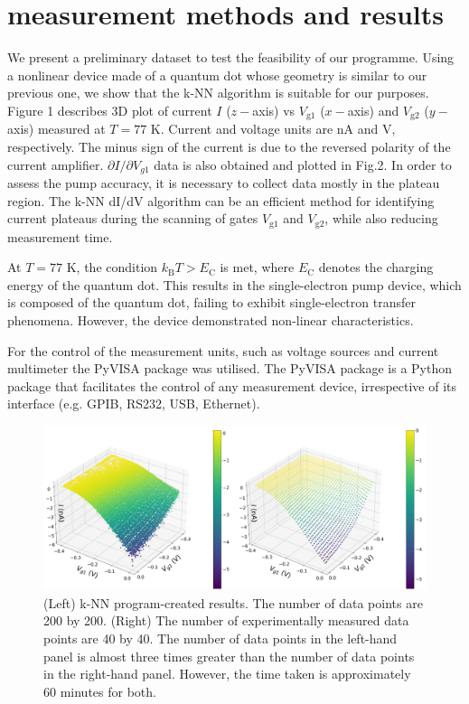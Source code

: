 \documentclass[jkps,preprint,fleqn,showpacs,showkeys]{revtex4}
\begin{document}
\section{measurement methods and results}
We present a preliminary dataset to test the feasibility of our programme.
Using a nonlinear device made of a quantum dot whose geometry is similar to our previous one\cite{bae}, we show that the k-NN algorithm is suitable for our purposes.
Figure 1 describes 3D plot of current $I$ ($z-$axis) vs $V_\text{g1}$ ($x-$axis) and $V_\text{g2}$ ($y-$axis) measured at $T=77$ K. Current and voltage units are nA and V, respectively. 
The minus sign of the current is due to the reversed polarity of the current amplifier. 
$\partial I/\partial V_{g1}$ data is also obtained and plotted in Fig.2. 
In order to assess the pump accuracy, it is necessary to collect data mostly in the plateau region. 
The k-NN dI/dV algorithm can be an efficient method for identifying current plateaus during the scanning of gates  $V_\text{g1}$ and $V_\text{g2}$, while also reducing measurement time.


At $T=77$ K, the condition $k_\text{B}T > E_\text{C} $ is met, where $E_\text{C} $ denotes the charging energy of the quantum dot. This results in the single-electron pump device, which is composed of the quantum dot, failing to exhibit single-electron transfer phenomena. However, the device demonstrated non-linear characteristics.

For the control of the measurement units, such as voltage sources and current multimeter the PyVISA package was utilised. The PyVISA package is a Python package that facilitates the control of any measurement device, irrespective of its interface (e.g. GPIB, RS232, USB, Ethernet).\cite{pyvisa}



\renewcommand{\figurename}{Fig. }
\begin{figure}[b]
\centering
\includegraphics[width=12cm]{Fig_I_Vg}
\parbox{13cm}{\vspace*{0.5cm}
\caption{(Left) k-NN program-created results. The number of data points are 200 by
200. (Right) The number of experimentally measured data points are 40 by 40. 
The number of data points in the left-hand panel is almost three times greater than the number of data points in the right-hand panel. However, the time taken is approximately 60 minutes for both.}
\label{plot1}}
\end{figure}
\end{document}

